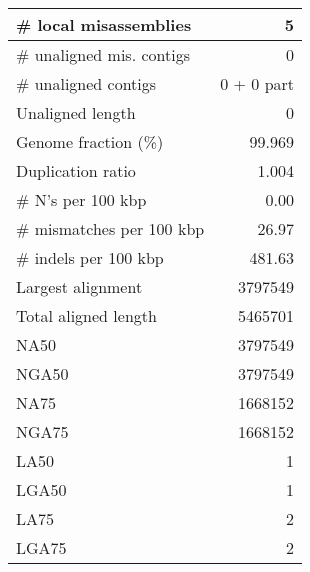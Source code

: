 \documentclass[12pt,a4paper]{article}
\begin{document}
\begin{table}[ht]
\begin{center}
\begin{tabular}{|l*{1}{|r}|}
\# local misassemblies & 5 \\ \hline
\# unaligned mis. contigs & 0 \\ \hline
\# unaligned contigs & 0 + 0 part \\ \hline
Unaligned length & 0 \\ \hline
Genome fraction (\%) & 99.969 \\ \hline
Duplication ratio & 1.004 \\ \hline
\# N's per 100 kbp & 0.00 \\ \hline
\# mismatches per 100 kbp & 26.97 \\ \hline
\# indels per 100 kbp & 481.63 \\ \hline
Largest alignment & 3797549 \\ \hline
Total aligned length & 5465701 \\ \hline
NA50 & 3797549 \\ \hline
NGA50 & 3797549 \\ \hline
NA75 & 1668152 \\ \hline
NGA75 & 1668152 \\ \hline
LA50 & 1 \\ \hline
LGA50 & 1 \\ \hline
LA75 & 2 \\ \hline
LGA75 & 2 \\ \hline
\end{tabular}
\end{center}
\end{table}
\end{document}

